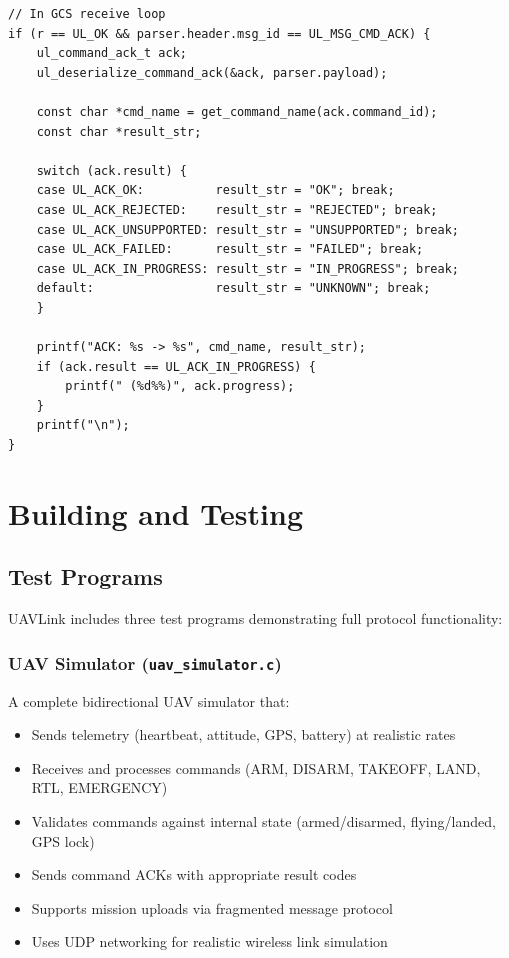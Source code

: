 \documentclass[11pt,a4paper]{article}
\begin{document}
\begin{lstlisting}[caption={GCS: Receive and display ACK}]
// In GCS receive loop
if (r == UL_OK && parser.header.msg_id == UL_MSG_CMD_ACK) {
    ul_command_ack_t ack;
    ul_deserialize_command_ack(&ack, parser.payload);
    
    const char *cmd_name = get_command_name(ack.command_id);
    const char *result_str;
    
    switch (ack.result) {
    case UL_ACK_OK:          result_str = "OK"; break;
    case UL_ACK_REJECTED:    result_str = "REJECTED"; break;
    case UL_ACK_UNSUPPORTED: result_str = "UNSUPPORTED"; break;
    case UL_ACK_FAILED:      result_str = "FAILED"; break;
    case UL_ACK_IN_PROGRESS: result_str = "IN_PROGRESS"; break;
    default:                 result_str = "UNKNOWN"; break;
    }
    
    printf("ACK: %s -> %s", cmd_name, result_str);
    if (ack.result == UL_ACK_IN_PROGRESS) {
        printf(" (%d%%)", ack.progress);
    }
    printf("\n");
}
\end{lstlisting}

\newpage
\newpage
\section{Building and Testing}

\subsection{Test Programs}

UAVLink includes three test programs demonstrating full protocol functionality:

\subsubsection{UAV Simulator (\texttt{uav\_simulator.c})}

A complete bidirectional UAV simulator that:
\begin{itemize}[noitemsep]
    \item Sends telemetry (heartbeat, attitude, GPS, battery) at realistic rates
    \item Receives and processes commands (ARM, DISARM, TAKEOFF, LAND, RTL, EMERGENCY)
    \item Validates commands against internal state (armed/disarmed, flying/landed, GPS lock)
    \item Sends command ACKs with appropriate result codes
    \item Supports mission uploads via fragmented message protocol
    \item Uses UDP networking for realistic wireless link simulation
\end{itemize}
\end{document}
